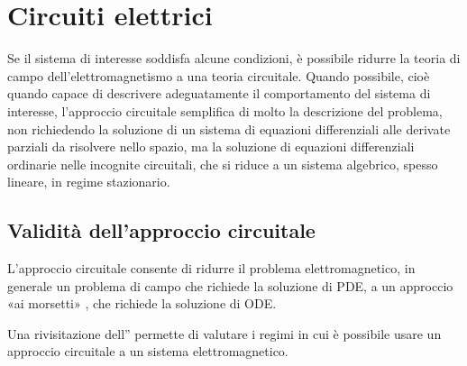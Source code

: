 \documentclass[letterpaper,10pt,italian]{jupyterBook}
\begin{document}
\sphinxstepscope




\section{Circuiti elettrici}
\label{\detokenize{ch/circuits-electric:circuiti-elettrici}}\label{\detokenize{ch/circuits-electric:classical-electromagnetism-circuits-electric}}\label{\detokenize{ch/circuits-electric::doc}}
\sphinxAtStartPar
Se il sistema di interesse soddisfa alcune condizioni, è possibile ridurre la teoria di campo dell’elettromagnetismo a una teoria circuitale.
Quando possibile, cioè quando capace di descrivere adeguatamente il comportamento del sistema di interesse, l’approccio circuitale semplifica di molto la descrizione del problema, non richiedendo la soluzione di un sistema di equazioni differenziali alle derivate parziali da risolvere nello spazio, ma la soluzione di equazioni differenziali ordinarie nelle incognite circuitali, che si riduce a un sistema algebrico, spesso lineare, in regime stazionario.

\sphinxAtStartPar
{}

\sphinxAtStartPar
{}

\sphinxstepscope




\subsection{Validità dell’approccio circuitale}
\label{\detokenize{ch/circuits-electric-approximation:validita-dell-approccio-circuitale}}\label{\detokenize{ch/circuits-electric-approximation:classical-electromagnetism-circuits-electric-approximation}}\label{\detokenize{ch/circuits-electric-approximation::doc}}
\sphinxAtStartPar
L’approccio circuitale consente di ridurre il problema elettromagnetico, in generale un problema di campo che richiede la soluzione di PDE, a un approccio «ai morsetti» , che richiede la soluzione di ODE.

\sphinxAtStartPar
Una rivisitazione dell”{\hyperref[\detokenize{ch/energy-linear:classical-electromagnetism-energy}]{}} permette di valutare i regimi in cui è possibile usare un approccio circuitale a un sistema elettromagnetico.
\end{document}
